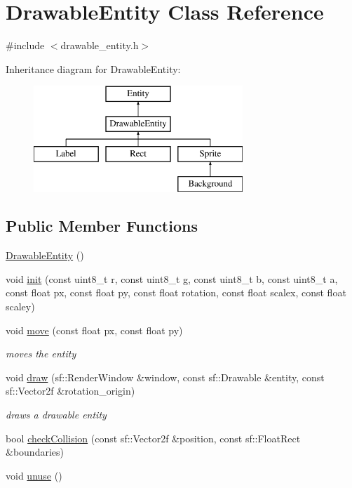 \hypertarget{class_drawable_entity}{}\section{Drawable\+Entity Class Reference}
\label{class_drawable_entity}


{\ttfamily \#include $<$drawable\+\_\+entity.\+h$>$}

Inheritance diagram for Drawable\+Entity\+:\begin{figure}[H]
\begin{center}
\leavevmode
\includegraphics[height=4.000000cm]{class_drawable_entity}
\end{center}
\end{figure}
\subsection*{Public Member Functions}
\begin{DoxyCompactItemize}
\item 
\hyperlink{class_drawable_entity_a8e9f9afa7c76fdc19e27ca0975ffcb21}{Drawable\+Entity} ()
\item 
void \hyperlink{class_drawable_entity_a3893879bf0710a7f5c5e7eb758ad7e96}{init} (const uint8\+\_\+t r, const uint8\+\_\+t g, const uint8\+\_\+t b, const uint8\+\_\+t a, const float px, const float py, const float rotation, const float scalex, const float scaley)
\item 
void \hyperlink{class_drawable_entity_a016d3d0cc80f9834918de44e0adb19fb}{move} (const float px, const float py)
\begin{DoxyCompactList}\small\item\em moves the entity \end{DoxyCompactList}\item 
void \hyperlink{class_drawable_entity_a31ea3607cab83dc56103de086764369e}{draw} (sf\+::\+Render\+Window \&window, const sf\+::\+Drawable \&entity, const sf\+::\+Vector2f \&rotation\+\_\+origin)
\begin{DoxyCompactList}\small\item\em draws a drawable entity \end{DoxyCompactList}\item 
bool \hyperlink{class_drawable_entity_aa8c71a16b70006246b445b546b71a5b3}{check\+Collision} (const sf\+::\+Vector2f \&position, const sf\+::\+Float\+Rect \&boundaries)
\item 
void \hyperlink{class_drawable_entity_ab1f94327e78e0b3607ece6a66bf9f01c}{unuse} ()
\end{DoxyCompactItemize}
